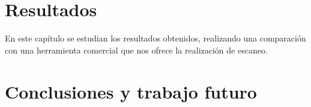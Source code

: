 \documentclass[oneside,12pt]{book}
\begin{document}
\chapter{Resultados}
En este capítulo se estudian los resultados obtenidos, realizando una comparación con una herramienta comercial que nos ofrece la realización de escaneo.


\chapter{Conclusiones y trabajo futuro}


\appendix
\renewcommand{\appendixname}{Anexo}
% 
% 
% 
% 




\clearpage




\printglossaries
\end{document}
